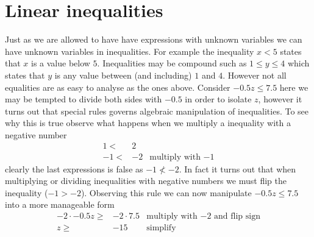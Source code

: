 \section{Linear inequalities}
Just as we are allowed to have have expressions with unknown variables we can have unknown variables in inequalities. For example the inequality $x < 5$ states that $x$ is a value below $5$. Inequalities may be compound such as $1 \leq y \leq 4$ which states that $y$ is any value between (and including) $1$ and $4$. However not all equalities are as easy to analyse as the ones above. Consider $-0.5z \leq 7.5$ here we may be tempted to divide both sides with $-0.5$ in order to isolate $z$, however it turns out that special rules governs algebraic manipulation of inequalities. To see why this is true observe what happens when we multiply a inequality with a negative number
\begin{align*}
1  <& 2  &                             \\
-1 <& -2 & \textrm{multiply with $-1$}
\end{align*}
clearly the last expressions is false as $-1 \nless -2$. In fact it turns out that when multiplying or dividing inequalities with negative numbers we must flip the inequality ($-1 > -2$). Observing this rule we can now manipulate $-0.5z \leq 7.5$ into a more manageable form
\begin{align*}
-2 \cdot -0.5z \geq& -2 \cdot 7.5 & \textrm{multiply with $-2$ and flip sign} \\
z              \geq& -15          & \textrm{simplify}
\end{align*}

